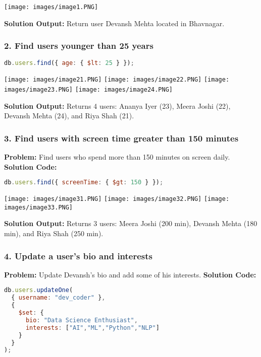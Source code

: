 \documentclass[12pt,a4paper]{article}
\begin{document}
\begin{center}
\texttt{[image: images/image1.PNG]}
\end{center}
\textbf{Solution Output:} Return user Devansh Mehta located in Bhavnagar.

\subsubsection{2. Find users younger than 25 years}
\begin{lstlisting}[language=JavaScript]
db.users.find({ age: { $lt: 25 } });
\end{lstlisting}

\begin{center}
\texttt{[image: images/image21.PNG]}
\texttt{[image: images/image22.PNG]}
\texttt{[image: images/image23.PNG]}
\texttt{[image: images/image24.PNG]}
\end{center}
\textbf{Solution Output:} Returns 4 users: Ananya Iyer (23), Meera Joshi (22), Devansh Mehta (24), and Riya Shah (21).


\subsubsection{3. Find users with screen time greater than 150 minutes}
\textbf{Problem:} Find users who spend more than 150 minutes on screen daily.
\textbf{Solution Code:}
\begin{lstlisting}[language=JavaScript]
db.users.find({ screenTime: { $gt: 150 } });
\end{lstlisting}

\begin{center}
\texttt{[image: images/image31.PNG]}
\texttt{[image: images/image32.PNG]}
\texttt{[image: images/image33.PNG]}
\end{center}
\textbf{Solution Output:} Returns 3 users: Meera Joshi (200 min), Devansh Mehta (180 min), and Riya Shah (250 min).

\subsubsection{4. Update a user's bio and interests}
\textbf{Problem:} Update Devansh's bio and add some of his interests.
\textbf{Solution Code:}
\begin{lstlisting}[language=JavaScript]
db.users.updateOne(
  { username: "dev_coder" },
  {
    $set: {
      bio: "Data Science Enthusiast",
      interests: ["AI","ML","Python","NLP"]
    }
  }
);
\end{lstlisting}
\end{document}
